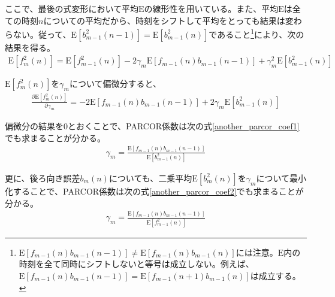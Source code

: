 \documentclass[uplatex,dvipdfmx,b5j,10pt]{jsbook}
\theoremstyle{definition}
\begin{document}
ここで、最後の式変形において平均$\textrm{E}$の線形性を用いている。また、平均$\textrm{E}$は全ての時刻$n$についての平均だから、時刻をシフトして平均をとっても結果は変わらない。従って、$\textrm{E}\left[ b_{m-1}^{2}(n - 1) \right] = \textrm{E}\left[ b_{m-1}^{2}(n) \right]$であること\footnote{$\textrm{E}\left[ f_{m-1}(n)b_{m-1}(n - 1) \right] \neq \textrm{E}\left[ f_{m-1}(n)b_{m-1}(n) \right]$には注意。$\textrm{E}$内の時刻を全て同時にシフトしないと等号は成立しない。例えば、$\textrm{E}[f_{m-1}(n)b_{m-1}(n-1)] = \textrm{E}[f_{m-1}(n+1)b_{m-1}(n)]$は成立する。}により、次の結果を得る。
\begin{eqnarray}
  \textrm{E}[f_{m}^{2}(n)] = \textrm{E}\left[ f_{m-1}^{2}(n) \right] - 2 \gamma_{m} \textrm{E}\left[ f_{m-1}(n)b_{m-1}(n - 1) \right] + \gamma_{m}^{2} \textrm{E}\left[ b_{m-1}^{2}(n) \right] \label{square_of_forward_residual}
\end{eqnarray}

$\textrm{E}[f_{m}^{2}(n)]$を$\gamma_{m}$について偏微分すると、
\begin{eqnarray*}
  \frac{\partial \textrm{E}[f_{m}^{2}(n)]}{\partial \gamma_{m}} = -2 \textrm{E}\left[ f_{m-1}(n)b_{m-1}(n - 1) \right] + 2 \gamma_{m} \textrm{E}\left[ b_{m-1}^{2}(n) \right] 
\end{eqnarray*}

偏微分の結果を$0$とおくことで、PARCOR係数は次の式\ref{another_parcor_coef1}でも求まることが分かる。
\begin{eqnarray} \label{another_parcor_coef1}
  \gamma_{m} = \frac{\textrm{E}\left[ f_{m-1}(n)b_{m-1}(n - 1) \right]}{\textrm{E}\left[ b_{m-1}^{2}(n) \right]}
\end{eqnarray}

更に、後ろ向き誤差$b_{m}(n)$についても、二乗平均$\textrm{E}[b_{m}^{2}(n)]$を$\gamma_{m}$について最小化することで、PARCOR係数は次の式\ref{another_parcor_coef2}でも求まることが分かる。
\begin{eqnarray} \label{another_parcor_coef2}
  \gamma_{m} = \frac{\textrm{E}\left[ f_{m-1}(n)b_{m-1}(n - 1) \right]}{\textrm{E}\left[ f_{m-1}^{2}(n) \right]}
\end{eqnarray}
\end{document}
